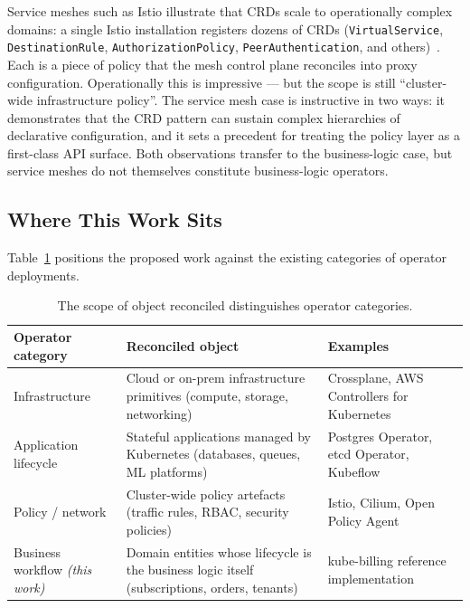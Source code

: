 Service meshes such as Istio illustrate that CRDs scale to operationally complex domains: a single Istio installation registers dozens of CRDs (\texttt{VirtualService}, \texttt{DestinationRule}, \texttt{AuthorizationPolicy}, \texttt{PeerAuthentication}, and others)~\cite{istio, nist_service_mesh_security}. Each is a piece of policy that the mesh control plane reconciles into proxy configuration. Operationally this is impressive --- but the scope is still ``cluster-wide infrastructure policy''. The service mesh case is instructive in two ways: it demonstrates that the CRD pattern can sustain complex hierarchies of declarative configuration, and it sets a precedent for treating the policy layer as a first-class API surface. Both observations transfer to the business-logic case, but service meshes do not themselves constitute business-logic operators.

\subsection{Where This Work Sits}

Table~\ref{tab:operator-scopes} positions the proposed work against the existing categories of operator deployments.

\begin{table}[h]
\centering
\small
\caption{The scope of object reconciled distinguishes operator categories.}
\label{tab:operator-scopes}
\begin{tabularx}{\textwidth}{@{}lXX@{}}
\toprule
\textbf{Operator category} & \textbf{Reconciled object} & \textbf{Examples} \\ \midrule
Infrastructure & Cloud or on-prem infrastructure primitives (compute, storage, networking) & Crossplane, AWS Controllers for Kubernetes \\
Application lifecycle & Stateful applications managed by Kubernetes (databases, queues, ML platforms) & Postgres Operator, etcd Operator, Kubeflow \\
Policy / network & Cluster-wide policy artefacts (traffic rules, RBAC, security policies) & Istio, Cilium, Open Policy Agent \\
Business workflow \emph{(this work)} & Domain entities whose lifecycle is the business logic itself (subscriptions, orders, tenants) & kube-billing reference implementation \\
\bottomrule
\end{tabularx}
\end{table}

